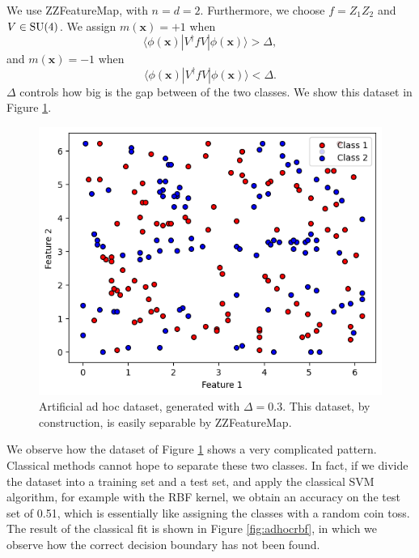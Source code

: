 \documentclass[a4paper]{article}
\begin{document}
We use ZZFeatureMap, with $n=d=2$. Furthermore, we choose $f=Z_1Z_2$ and $V\in\textup{SU}(4)$. We assign $m(\mathbf{x})=+1$ when 
\begin{equation}
    \langle \phi(\mathbf{x}) |V^\dagger f V|\phi(\mathbf{x})\rangle >\Delta,
\end{equation} 
and $m(\mathbf{x})=-1$ when 
\begin{equation}
    \langle \phi(\mathbf{x}) |V^\dagger f V|\phi(\mathbf{x})\rangle <\Delta.
\end{equation} 
$\Delta$ controls how big is the gap between of the two classes. We show this dataset in Figure \ref{fig:adhoc}.
\begin{figure}[h!]
    \centering
    \includegraphics[width=\textwidth]{images/adhoc.png}
    \caption{Artificial ad hoc dataset, generated with $\Delta=0.3$. This dataset, by construction, is easily separable by ZZFeatureMap.}
    \label{fig:adhoc}
\end{figure}
We observe how the dataset of Figure \ref{fig:adhoc} shows a very complicated pattern. Classical methods cannot hope to separate these two classes. In fact, if we divide the dataset into a training set and a test set, and apply the classical SVM algorithm, for example with the RBF kernel, we obtain an accuracy on the test set of 0.51, which is essentially like assigning the classes with a random coin toss. The result of the classical fit is shown in Figure \ref{fig:adhocrbf}, in which we observe how the correct decision boundary has not been found. 
\end{document}
